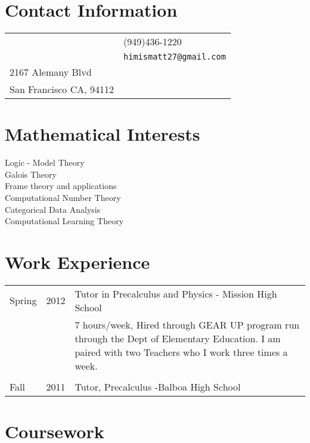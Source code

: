 \documentclass[margin,line,pifont,palatino,courier]{res}
\begin{document}

\begin{resume}

\section{\sc Contact Information}

\vspace{.05in}
\begin{tabular}{@{}p{2.75in}p{2in}}
  & (949)436-1220 \\
                     & \verb+himismatt27@gmail.com+\\

2167 Alemany Blvd              & \\
San Francisco CA, 94112              & \\
\end{tabular}

\section{\sc Mathematical Interests}
Logic - Model Theory\\
 Galois Theory\\
 Frame theory and applications\\
 Computational Number Theory\\
 Categorical Data Analysis\\
  Computational Learning Theory\\
 
\section{\sc Work Experience}

\begin{tabular}{@{}p{0.4in}p{0.3in}p{4in}}
Spring & 2012 & Tutor in  Precalculus and Physics - Mission High School\\
  &    &    7 hours/week, Hired through GEAR UP program run through the Dept of Elementary Education.  I am paired with two Teachers who I work three times a week.  \\
  \\
Fall & 2011 &  Tutor, Precalculus  -Balboa High School\\

\end{tabular}


\section{\sc Coursework}


\end{resume}
\end{document}
